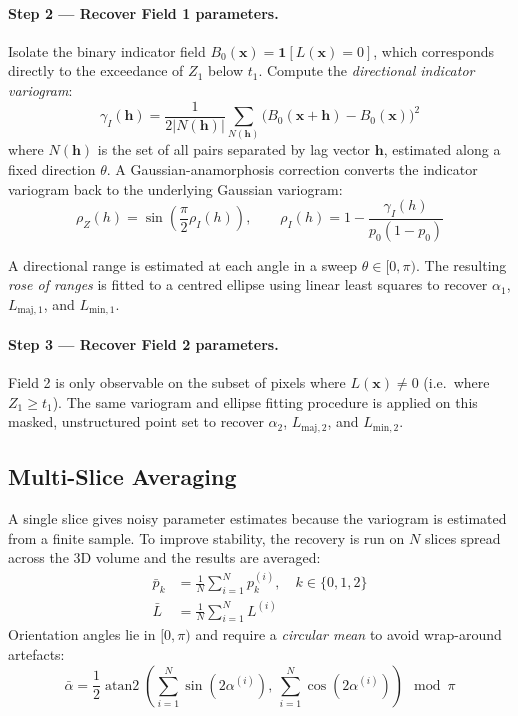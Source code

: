 \documentclass[11pt, a4paper]{article}
\begin{document}
\paragraph{Step 2 --- Recover Field 1 parameters.}
Isolate the binary indicator field $B_0(\mathbf{x}) = \mathbf{1}[L(\mathbf{x}) = 0]$, which corresponds directly to the exceedance of $Z_1$ below $t_1$. Compute the \emph{directional indicator variogram}:
\begin{equation}
    \gamma_I(\mathbf{h}) = \frac{1}{2|N(\mathbf{h})|} \sum_{N(\mathbf{h})} \bigl(B_0(\mathbf{x}+\mathbf{h}) - B_0(\mathbf{x})\bigr)^2
\end{equation}
where $N(\mathbf{h})$ is the set of all pairs separated by lag vector $\mathbf{h}$, estimated along a fixed direction $\theta$. A Gaussian-anamorphosis correction converts the indicator variogram back to the underlying Gaussian variogram:
\begin{equation}
    \rho_Z(h) = \sin\!\left(\frac{\pi}{2} \rho_I(h)\right), \qquad \rho_I(h) = 1 - \frac{\gamma_I(h)}{p_0(1-p_0)}
\end{equation}

A directional range is estimated at each angle in a sweep $\theta \in [0, \pi)$. The resulting \emph{rose of ranges} is fitted to a centred ellipse using linear least squares to recover $\alpha_1$, $L_{\text{maj},1}$, and $L_{\text{min},1}$.

\paragraph{Step 3 --- Recover Field 2 parameters.}
Field 2 is only observable on the subset of pixels where $L(\mathbf{x}) \neq 0$ (i.e.\ where $Z_1 \geq t_1$). The same variogram and ellipse fitting procedure is applied on this masked, unstructured point set to recover $\alpha_2$, $L_{\text{maj},2}$, and $L_{\text{min},2}$.

\subsection{Multi-Slice Averaging}

A single slice gives noisy parameter estimates because the variogram is estimated from a finite sample. To improve stability, the recovery is run on $N$ slices spread across the 3D volume and the results are averaged:
\begin{align}
    \bar{p}_k &= \frac{1}{N}\sum_{i=1}^N p_k^{(i)}, \quad k \in \{0,1,2\} \\
    \bar{L} &= \frac{1}{N}\sum_{i=1}^N L^{(i)}
\end{align}
Orientation angles lie in $[0, \pi)$ and require a \emph{circular mean} to avoid wrap-around artefacts:
\begin{equation}
    \bar{\alpha} = \frac{1}{2}\operatorname{atan2}\!\left(\sum_{i=1}^N \sin(2\alpha^{(i)}),\ \sum_{i=1}^N \cos(2\alpha^{(i)})\right) \mod \pi
\end{equation}
\end{document}
